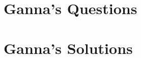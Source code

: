 \documentclass[a4paper,12pt]{book}
\begin{document}
\tableofcontents

\part{Ganna's Questions}


\part{Ganna's Solutions}



\end{document}

